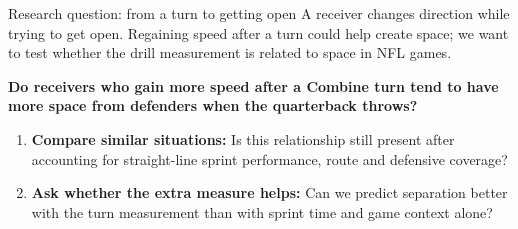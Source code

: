 \documentclass[aspectratio=169,11pt]{beamer}
\newcommand{\key}[1]{{\color{teal}\bfseries #1}}
\begin{document}
\begin{frame}{Research question: from a turn to getting open}
\small
A receiver changes direction while trying to get open. Regaining speed after a turn could help create space; we want to test whether the drill measurement is related to space in NFL games.\par
\vspace{5mm}
\key{\large Do receivers who gain more speed after a Combine turn tend to have more space from defenders when the quarterback throws?}\par
\vspace{5mm}
\begin{enumerate}
\setlength{\itemsep}{3mm}
\item \textbf{Compare similar situations:} Is this relationship still present after accounting for straight-line sprint performance, route and defensive coverage?
\item \textbf{Ask whether the extra measure helps:} Can we predict separation better with the turn measurement than with sprint time and game context alone?
\end{enumerate}
\end{frame}
\end{document}
